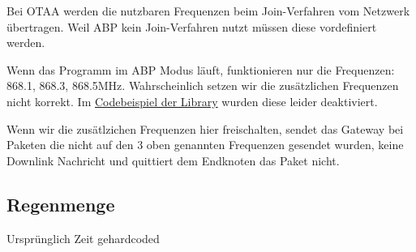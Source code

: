 \documentclass[12pt]{article}
\begin{document}
        Bei OTAA werden die nutzbaren Frequenzen beim Join-Verfahren vom Netzwerk übertragen.
        Weil ABP kein Join-Verfahren nutzt müssen diese vordefiniert werden.

        Wenn das Programm im ABP Modus läuft, funktionieren nur die Frequenzen: 868.1, 868.3, 868.5MHz.
        Wahrscheinlich setzen wir die zusätzlichen Frequenzen nicht korrekt.
        Im \href{https://github.com/dragino/arduino-lmic/blob/f2775468e19b2c2a35557ef2f8255cffb2a783be/examples/ttn-abp/ttn-abp.ino#L180}{Codebeispiel der Library}
        wurden diese leider deaktiviert.

        Wenn wir die zusätlzichen Frequenzen hier freischalten, sendet das Gateway bei Paketen die nicht auf den 3 oben genannten Frequenzen gesendet wurden, keine Downlink Nachricht
        und quittiert dem Endknoten das Paket nicht.

      

      \subsection{Regenmenge}
        Ursprünglich Zeit gehardcoded %
        
\end{document}
